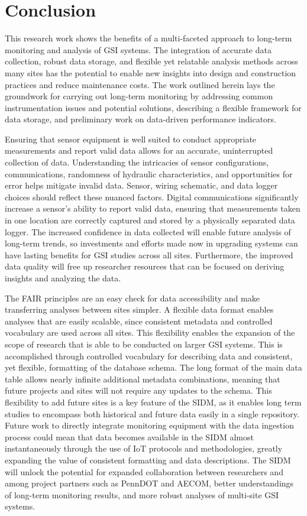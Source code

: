 %
\chapter{Conclusion}
\label{sec:conclusion}

This research work shows the benefits of a multi-faceted approach to long-term monitoring and analysis of GSI systems.
The integration of accurate data collection, robust data storage, and flexible yet relatable analysis methods across many sites has the potential to enable new insights into design and construction practices and reduce maintenance costs.
The work outlined herein lays the groundwork for carrying out long-term monitoring by addressing common instrumentation issues and potential solutions, describing a flexible framework for data storage, and preliminary work on data-driven performance indicators.

Ensuring that sensor equipment is well suited to conduct appropriate measurements and report valid data allows for an accurate, uninterrupted collection of data.
Understanding the intricacies of sensor configurations, communications, randomness of hydraulic characteristics, and opportunities for error helps mitigate invalid data.
Sensor, wiring schematic, and data logger choices should reflect these nuanced factors.
Digital communications significantly increase a sensor's ability to report valid data, ensuring that measurements taken in one location are correctly captured and stored by a physically separated data logger.
The increased confidence in data collected will enable future analysis of long-term trends, so investments and efforts made now in upgrading systems can have lasting benefits for GSI studies across all sites.
Furthermore, the improved data quality will free up researcher resources that can be focused on deriving insights and analyzing the data.

The FAIR principles are an easy check for data accessibility and make transferring analyses between sites simpler.
A flexible data format enables analyses that are easily scalable, since consistent metadata and controlled vocabulary are used across all sites.
This flexibility enables the expansion of the scope of research that is able to be conducted on larger GSI systems.
This is accomplished through controlled vocabulary for describing data and consistent, yet flexible, formatting of the database schema.
The long format of the main data table allows nearly infinite additional metadata combinations, meaning that future projects and sites will not require any updates to the schema.
This flexibility to add future sites is a key feature of the SIDM, as it enables long term studies to encompass both historical and future data easily in a single repository.
Future work to directly integrate monitoring equipment with the data ingestion process could mean that data becomes available in the SIDM almost instantaneously through the use of IoT protocols and methodologies, greatly expanding the value of consistent formatting and data descriptions.
The SIDM will unlock the potential for expanded collaboration between researchers and among project partners such as PennDOT and AECOM, better understandings of long-term monitoring results, and more robust analyses of multi-site GSI systems.

